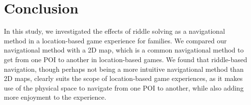\section{Conclusion}
In this study, we investigated the effects of riddle solving as a navigational method in a location-based game experience for families. We compared our navigational method with a 2D map, which is a common navigational method to get from one POI to another in location-based games. We found that riddle-based navigation, though perhaps not being a more intuitive navigational method than 2D maps, clearly suits the scope of location-based game experiences, as it makes use of the physical space to navigate from one POI to another, while also adding more enjoyment to the experience.